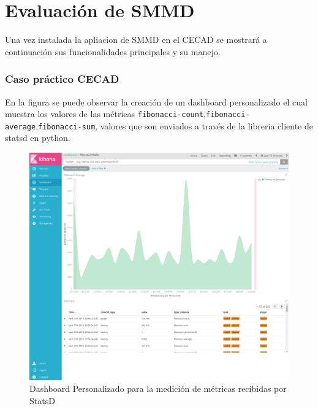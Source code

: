 \chapter{Evaluación de SMMD}

Una vez instalada la apliacion de SMMD en el CECAD se mostrará a continuación sus funcionalidades principales y su manejo.

\subsection{Caso práctico CECAD}

En la figura se puede observar la creación de un dashboard personalizado el cual muestra los valores de las métricas \texttt{fibonacci-count},\texttt{fibonacci-average},\texttt{fibonacci-sum}, valores que son enviados a través de la libreria cliente de statsd en python.


\begin{figure}[h]
 \centering
  \includegraphics[width=0.8\linewidth]{./imagenes/dashboard-fibonacci.png}
  \caption{Dashboard Personalizado para la medición de métricas recibidas por StatsD}
  \label{fig:dashboard-fibonacci}
\end{figure}